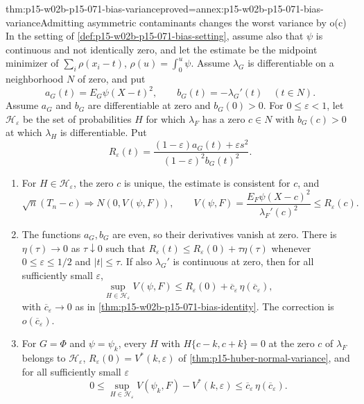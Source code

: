 \begin{hbtheorem}{thm:p15-w02b-p15-071-bias-variance}{proved=annex:p15-w02b-p15-071-bias-variance}{Admitting asymmetric contaminants changes the worst variance by o(c)}
In the setting of \cref{def:p15-w02b-p15-071-bias-setting}, assume also
that \(\psi\) is continuous and not identically zero, and let the
estimate be the midpoint minimizer of \(\sum_i\rho(x_i-t)\),
\(\rho(u)=\int_0^u\psi\). Assume \(\lambda_G\) is differentiable on a
neighborhood \(N\) of zero, and put
\[
 a_G(t)=E_G\psi(X-t)^2,\qquad b_G(t)=-\lambda_G'(t)\quad(t\in N).
\]
Assume \(a_G\) and \(b_G\) are differentiable at zero and \(b_G(0)>0\).
For \(0\leq\varepsilon<1\), let \(\mathcal H_\varepsilon\) be the set of
probabilities \(H\) for which \(\lambda_F\) has a zero \(c\in N\) with
\(b_G(c)>0\) at which \(\lambda_H\) is differentiable. Put
\[
 R_\varepsilon(t)=\frac{(1-\varepsilon)a_G(t)+\varepsilon s^2}
                       {(1-\varepsilon)^2b_G(t)^2}.
\]
\begin{enumerate}
\item For \(H\in\mathcal H_\varepsilon\), the zero \(c\) is unique,
 the estimate is consistent for \(c\), and
 \[
  \sqrt n(T_n-c)\Longrightarrow N(0,V(\psi,F)),\qquad
  V(\psi,F)=\frac{E_F\psi(X-c)^2}{\lambda_F'(c)^2}\leq R_\varepsilon(c).
 \]
\item The functions \(a_G,b_G\) are even, so their derivatives vanish at
 zero. There is \(\eta(\tau)\to0\) as \(\tau\downarrow0\) such that
 \(R_\varepsilon(t)\leq R_\varepsilon(0)+\tau\eta(\tau)\) whenever
 \(0\leq\varepsilon\leq1/2\) and \(|t|\leq\tau\).
 If also \(\lambda_G'\) is continuous at zero, then for all sufficiently
 small \(\varepsilon\),
 \[
  \sup_{H\in\mathcal H_\varepsilon}V(\psi,F)\leq
  R_\varepsilon(0)+\overline c_\varepsilon\,\eta(\overline c_\varepsilon),
 \]
 with \(\overline c_\varepsilon\to0\) as in
 \cref{thm:p15-w02b-p15-071-bias-identity}. The correction is
 \(o(\overline c_\varepsilon)\).
\item For \(G=\Phi\) and \(\psi=\psi_k\), every \(H\) with
 \(H\{c-k,c+k\}=0\) at the zero \(c\) of \(\lambda_F\) belongs to
 \(\mathcal H_\varepsilon\), \(R_\varepsilon(0)=V^*(k,\varepsilon)\) of
 \cref{thm:p15-huber-normal-variance}, and for all sufficiently small
 \(\varepsilon\)
 \[
  0\leq\sup_{H\in\mathcal H_\varepsilon}V(\psi_k,F)-V^*(k,\varepsilon)
   \leq\overline c_\varepsilon\,\eta(\overline c_\varepsilon).
 \]
\end{enumerate}
\end{hbtheorem}

